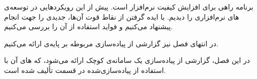 
 برنامه راهی برای افزایش کیفیت نرم‌افزار است. پیش از این رویکردهایی در توسعه‌ی های نرم‌افزاری را دیدیم. با ایده گرفتن از نقاط قوت آن‌ها،   جدیدی را جهت انجام  پیشنهاد می‌کنیم و فواید استفاده از آن را بررسی می‌کنیم.

در انتهای فصل نیز گزارشی از پیاده‌سازی  مربوطه بر پایه‌ی  ارائه می‌کنیم.







%



در این فصل، گزارشی از پیاده‌سازی یک سامانه‌ی کوچک ارائه می‌شود، که ‌های آن با استفاده از  پیاده‌سازی‌شده در قسمت  تألیف شده است.



